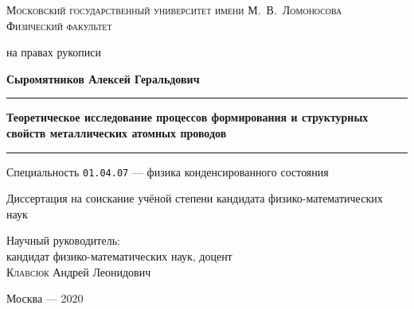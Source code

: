 
\newcommand{\thisyear}{2020}
\newcommand{\HRule}{\rule{\linewidth}{0.3mm}}

\begin{titlepage}
\begin{center}
\textsc{\Large Московский государственный университет имени М.~В.~Ломоносова \\[0.27cm] Физический факультет}\\
\vspace{2cm}

\hfill на правах рукописи \\
\vspace{1.8cm}

\textbf{\Large Сыромятников Алексей Геральдович}
\vspace{1cm}

\HRule 
\vspace{0.4cm}
\begin{spacing}{1.6}
\textbf{\huge Теоретическое исследование процессов формирования и структурных свойств металлических атомных проводов}
\end{spacing}
\vspace*{0cm}
\HRule 
\vspace{1cm}

Специальность \texttt{01.04.07} --- физика конденсированного состояния
\vspace{1cm}

{\large Диссертация на соискание учёной степени кандидата физико-математических наук}
\end{center}

\vspace{1cm}
\hfill
\begin{minipage}[t]{0.65\textwidth}
	\begin{flushright} \large
	Научный руководитель: \\
	кандидат физико-математических наук, доцент \\
	\textsc{Клавсюк} Андрей Леонидович
	\end{flushright}
\end{minipage}



\vfill
\begin{center}
\large Москва --- \thisyear
\end{center}
\end{titlepage}

